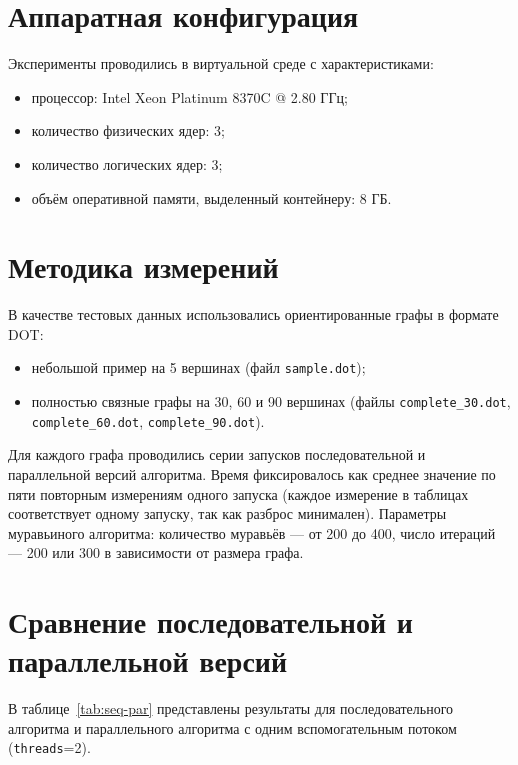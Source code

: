 
\section*{Аппаратная конфигурация}
Эксперименты проводились в виртуальной среде с характеристиками:
\begin{itemize}
        \item процессор: Intel Xeon Platinum 8370C @ 2.80 ГГц;
        \item количество физических ядер: 3;
        \item количество логических ядер: 3;
        \item объём оперативной памяти, выделенный контейнеру: 8 ГБ.
\end{itemize}

\section*{Методика измерений}
В качестве тестовых данных использовались ориентированные графы в формате DOT:
\begin{itemize}
        \item небольшой пример на 5 вершинах (файл \texttt{sample.dot});
        \item полностью связные графы на 30, 60 и 90 вершинах (файлы \texttt{complete\_30.dot}, \texttt{complete\_60.dot}, \texttt{complete\_90.dot}).
\end{itemize}

Для каждого графа проводились серии запусков последовательной и параллельной версий
алгоритма. Время фиксировалось как среднее значение по пяти повторным измерениям одного
запуска (каждое измерение в таблицах соответствует одному запуску, так как разброс минимален).
Параметры муравьиного алгоритма: количество муравьёв --- от 200 до 400, число итераций --- 200
или 300 в зависимости от размера графа.

\section*{Сравнение последовательной и параллельной версий}
В таблице~\ref{tab:seq-par} представлены результаты для последовательного алгоритма и
параллельного алгоритма с одним вспомогательным потоком (\texttt{threads}=2).

